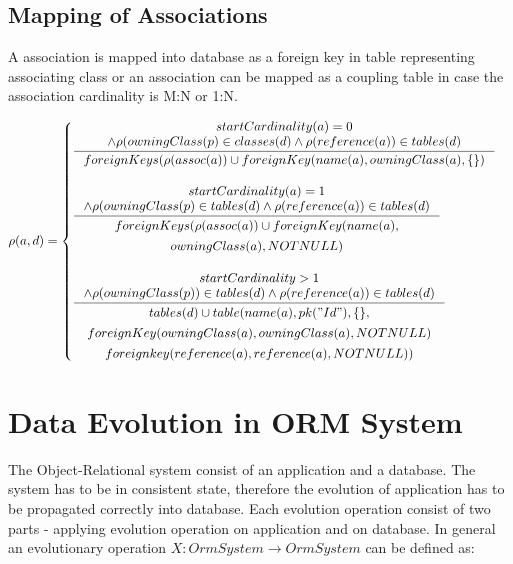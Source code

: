 \documentclass[11pt]{article}
\begin{document}
\subsection{Mapping of Associations}
A association is mapped into database as a foreign key in table representing associating class or an association can be mapped as a coupling table in case the association cardinality is M:N or 1:N.

$
\rho(a,d) = \begin{cases}
 \inference{startCardinality(a) = 0 \\ \wedge \rho(owningClass(p) \in classes(d)  \wedge \rho(reference(a)) \in tables(d)}{foreignKeys(\rho(assoc(a)) \cup foreignKey(name(a), owningClass(a),  \{ \}) } \\ \\
 
 \inference{startCardinality(a) = 1 \\ \wedge \rho(owningClass(p) \in tables(d)  \wedge \rho(reference(a)) \in tables(d)}{\begin{gathered}
 foreignKeys(\rho(assoc(a)) \cup foreignKey(name(a), \\ owningClass(a),  NOTNULL)
\end{gathered}
} \\ \\
 
  \inference{startCardinality > 1 \\ \wedge \rho(owningClass(p)) \in tables(d) \wedge \rho(reference(a)) \in tables(d)}{
  \begin{gathered}
  tables(d) \cup table(name(a), pk("Id"), \{ \}, \\ foreignKey(owningClass(a),owningClass(a), NOTNULL) \\ foreignkey(reference(a), reference(a), NOTNULL)) 
  \end{gathered}}

  
 \end{cases}
$


\section{Data Evolution in ORM System}
The Object-Relational system consist of an application and a database. The system has to be in consistent state, therefore the evolution of application has to be propagated correctly into database. Each evolution operation consist of two parts - applying evolution operation on application and on database. In general an evolutionary operation $X : OrmSystem \rightarrow OrmSystem $ can be defined as:
\end{document}
